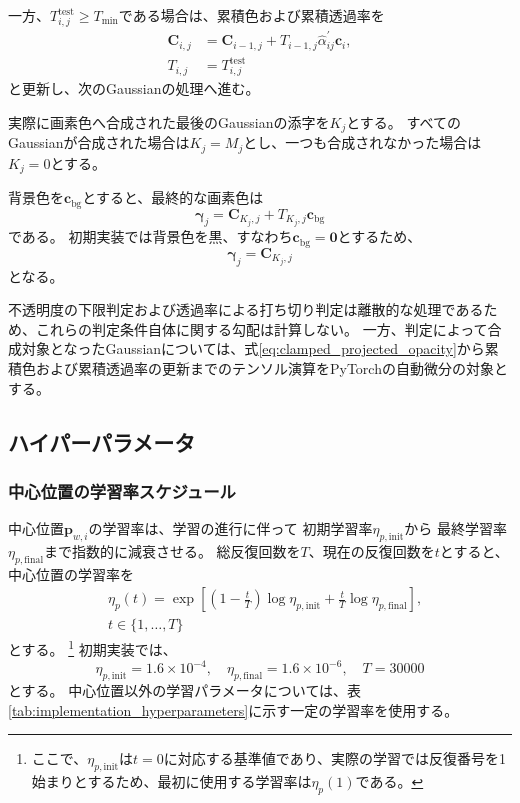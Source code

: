 \documentclass[dvipdfmx]{jlreq}
\begin{document}
一方、$T_{i,j}^{\mathrm{test}}\geq T_{\min}$である場合は、累積色および累積透過率を
\begin{align}
    \bm{C}_{i,j} &= \bm{C}_{i-1,j} + T_{i-1,j} \widehat{\alpha}_{ij}^{\prime} \bm{c}_i,
    \label{eq:stable_color_accumulation}\\
    T_{i,j} &= T_{i,j}^{\mathrm{test}}
\end{align}
と更新し、次のGaussianの処理へ進む。

実際に画素色へ合成された最後のGaussianの添字を$K_j$とする。
すべてのGaussianが合成された場合は$K_j=M_j$とし、一つも合成されなかった場合は$K_j=0$とする。

背景色を$\bm{c}_{\mathrm{bg}}$とすると、最終的な画素色は
\begin{equation}
    \bm{\gamma}_j = \bm{C}_{K_j,j} + T_{K_j,j}\bm{c}_{\mathrm{bg}}
    \label{eq:implementation_pixel_color_with_background}
\end{equation}
である。
初期実装では背景色を黒、すなわち$\bm{c}_{\mathrm{bg}}=\bm{0}$とするため、
\begin{equation}
    \bm{\gamma}_j = \bm{C}_{K_j,j}
\end{equation}
となる。

不透明度の下限判定および透過率による打ち切り判定は離散的な処理であるため、これらの判定条件自体に関する勾配は計算しない。
一方、判定によって合成対象となったGaussianについては、式\eqref{eq:clamped_projected_opacity}から累積色および累積透過率の更新までのテンソル演算をPyTorchの自動微分の対象とする。

\subsection{ハイパーパラメータ}
\subsubsection*{中心位置の学習率スケジュール}
中心位置$\bm{p}_{w,i}$の学習率は、学習の進行に伴って
初期学習率$\eta_{p,\mathrm{init}}$から
最終学習率$\eta_{p,\mathrm{final}}$まで指数的に減衰させる。
総反復回数を$T$、現在の反復回数を$t$とすると、
中心位置の学習率を
\begin{equation}
    \begin{aligned}
        &\eta_p(t) = \exp\left[ \left(1-\frac{t}{T}\right) \log\eta_{p,\mathrm{init}} + \frac{t}{T} \log\eta_{p,\mathrm{final}} \right], \\
        &t\in\{1,\ldots,T\}
    \end{aligned}
    \label{eq:position_learning_rate_schedule}
\end{equation}
とする。
\footnote{ここで、$\eta_{p,\mathrm{init}}$は$t=0$に対応する基準値であり、実際の学習では反復番号を1始まりとするため、最初に使用する学習率は$\eta_p(1)$である。}
初期実装では、
\begin{equation}
    \eta_{p,\mathrm{init}}=1.6\times10^{-4}, \quad \eta_{p,\mathrm{final}}=1.6\times10^{-6}, \quad T=30000
\end{equation}
とする。
中心位置以外の学習パラメータについては、表\ref{tab:implementation_hyperparameters}に示す一定の学習率を使用する。
\end{document}
